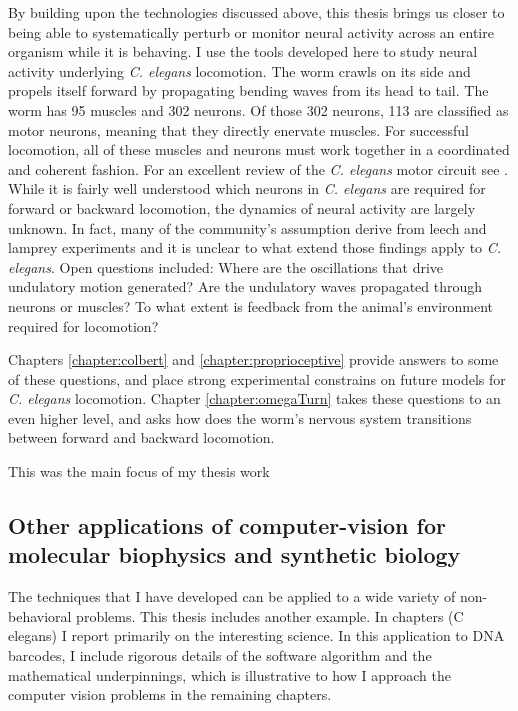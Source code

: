 By building upon the technologies discussed above, 
this thesis brings us closer to being able to systematically perturb or monitor neural activity across an entire organism while it is behaving. I use the tools developed here to study  neural activity underlying \emph{C. elegans} locomotion. The worm crawls on its side and propels itself forward by propagating bending waves from its head to tail.  The worm has 95 muscles and 302 neurons. Of those 302 neurons, 113 are classified as motor neurons, meaning that they directly enervate muscles. For successful locomotion, all of these muscles and neurons must work together in a coordinated and coherent fashion. For an excellent review of the \textit{C. elegans}  motor circuit see \citep{von_stetina_motor_2006}. While it is fairly well understood which neurons  in \textit{C. elegans} are required for forward or backward locomotion, the dynamics of neural activity are largely unknown. In fact, many of the community's assumption derive from leech and lamprey experiments \citep{friesen_sensory_2001, karbowski_systems_2008} and it is unclear to what extend those findings apply to \textit{C. elegans}. Open questions included: Where are the oscillations that drive undulatory motion generated? Are the undulatory waves propagated through neurons or muscles? To what extent is  feedback from the animal's environment required for locomotion? 

Chapters \ref{chapter:colbert} and \ref{chapter:proprioceptive} provide answers to some of these questions, and place strong experimental constrains on future models for \textit{C. elegans} locomotion.  Chapter \ref{chapter:omegaTurn} takes these questions to an even higher level, and asks how does the worm's nervous system transitions between forward and backward locomotion. 





This was the main focus of my thesis work

\subsection{Other applications of computer-vision for molecular biophysics and synthetic biology}
The techniques that I have developed  can be applied to a wide variety of non-behavioral problems. This thesis includes another example. In chapters (C elegans) I report primarily on the interesting science. In this application to DNA barcodes, I include rigorous details of the software algorithm and the mathematical underpinnings, which is illustrative to how I approach the computer vision problems in the remaining chapters. 

